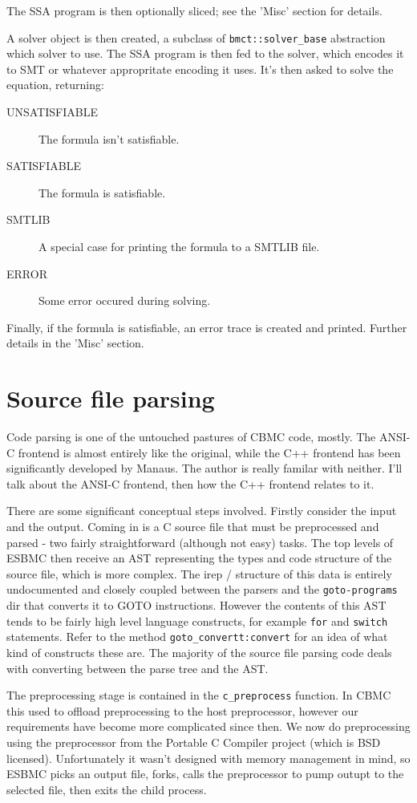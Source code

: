 \documentclass{article}
\begin{document}
The SSA program is then optionally sliced; see the 'Misc' section for details.

A solver object is then created, a subclass of \texttt{bmct::solver\_base}
abstraction which solver to use. The SSA program is then fed to the solver,
which encodes it to SMT or whatever appropritate encoding it uses. It's then
asked to solve the equation, returning:
\begin{description}
\item[UNSATISFIABLE] The formula isn't satisfiable.
\item[SATISFIABLE] The formula is satisfiable.
\item[SMTLIB] A special case for printing the formula to a SMTLIB file.
\item[ERROR] Some error occured during solving.
\end{description}

Finally, if the formula is satisfiable, an error trace is created and printed.
Further details in the 'Misc' section.

\section{Source file parsing}

Code parsing is one of the untouched pastures of CBMC code, mostly. The ANSI-C
frontend is almost entirely like the original, while the C++ frontend has been
significantly developed by Manaus. The author is really familar with neither.
I'll talk about the ANSI-C frontend, then how the C++ frontend relates to it.

There are some significant conceptual steps involved. Firstly consider
the input and the output. Coming in is a C source file that must be preprocessed
and parsed - two fairly straightforward (although not easy) tasks. The top
levels of ESBMC then receive an AST representing the types and code structure
of the source file, which is more complex. The irep / structure of this data
is entirely undocumented and closely coupled between the parsers and the
\texttt{goto-programs} dir that converts it to GOTO instructions. However the
contents of this AST tends to be fairly high level language constructs,
for example \texttt{for} and \texttt{switch} statements. Refer to the method
\texttt{goto\_convertt:convert} for an idea of what kind of constructs these
are. The majority of the source file parsing code deals with converting between
the parse tree and the AST.

The preprocessing stage is contained in the \texttt{c\_preprocess} function.
In CBMC this used to offload preprocessing to the host preprocessor, however
our requirements have become more complicated since then. We now do
preprocessing using the preprocessor from the Portable C Compiler project
(which is BSD licensed). Unfortunately it wasn't designed with memory management
in mind, so ESBMC picks an output file, forks, calls the preprocessor to pump
outupt to the selected file, then exits the child process.
\end{document}
